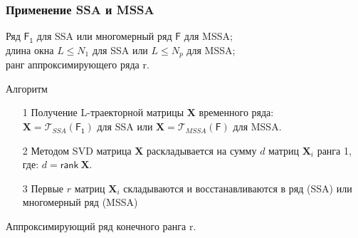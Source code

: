 \documentclass{beamer}
\begin{document}
    \begin{frame}
        \frametitle{Применение SSA и MSSA}
        Ряд $\mathsf{F_1}$ для SSA или многомерный ряд $\mathsf{F}$ для MSSA;\\
        длина окна $L \leq N_1$ для SSA или $L \leq N_p$ для MSSA;\\
        ранг аппроксимирующего ряда r.\\
        
        \begin{block}{Алгоритм}
            \begin{enumerate}
                \item[1] Получение L-траекторной матрицы $\mathbf{X}$ временного ряда:\\
                    $\mathbf{X} = \mathcal{T}_{SSA}(\mathsf{F_1})$ для SSA или $\mathbf{X} = \mathcal{T}_{MSSA}(\mathsf{F})$ для MSSA.
                \item[2] Методом SVD матрица $\mathbf{X}$ раскладывается на сумму $d$ матриц $\mathbf{X}_i$ ранга 1, где: $d = \mathsf{rank}\ \mathbf{X}$.
                \item[3] Первые $r$ матриц $\mathbf{X}_i$ складываются и восстанавливаются в ряд (SSA) или многомерный ряд (MSSA)
            \end{enumerate}
        \end{block}
        
        Аппроксимирующий ряд конечного ранга r.
    \end{frame}
\end{document}
